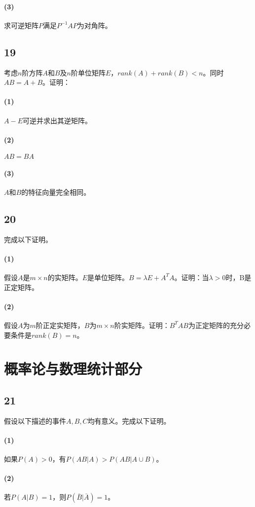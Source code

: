 \documentclass[a4paper,12pt]{article}
\begin{document}
\paragraph{(3)}求可逆矩阵$P$满足$P^{-1}AP$为对角阵。
\subsection*{19}
\noindent 考虑$n$阶方阵$A$和$B$及$n$阶单位矩阵$E$，$rank(A)+rank(B)<n$。同时$AB=A+B$。证明：
\paragraph{(1)}$A-E$可逆并求出其逆矩阵。
\paragraph{(2)}$AB=BA$
\paragraph{(3)}$A$和$B$的特征向量完全相同。

\subsection*{20}\noindent 完成以下证明。
\paragraph{(1)}假设$A$是$m\times n$的实矩阵。$E$是单位矩阵。$B=\lambda E+A^{T}A$。证明：当$\lambda>0$时，B是正定矩阵。
\paragraph{(2)}假设$A$为$m$阶正定实矩阵，$B$为$m\times n$阶实矩阵。证明：$B^{T}AB$为正定矩阵的充分必要条件是$rank(B)=n$。
\section*{概率论与数理统计部分}
\subsection*{21}\noindent 假设以下描述的事件$A,B,C$均有意义。完成以下证明。
\paragraph{(1)}如果$P(A)>0$，有$P(AB|A)>P(AB|A\cup B)$。
\paragraph{(2)}若$P(A|B)=1$，则$P(\bar{B}|\bar{A})=1$。
\end{document}
